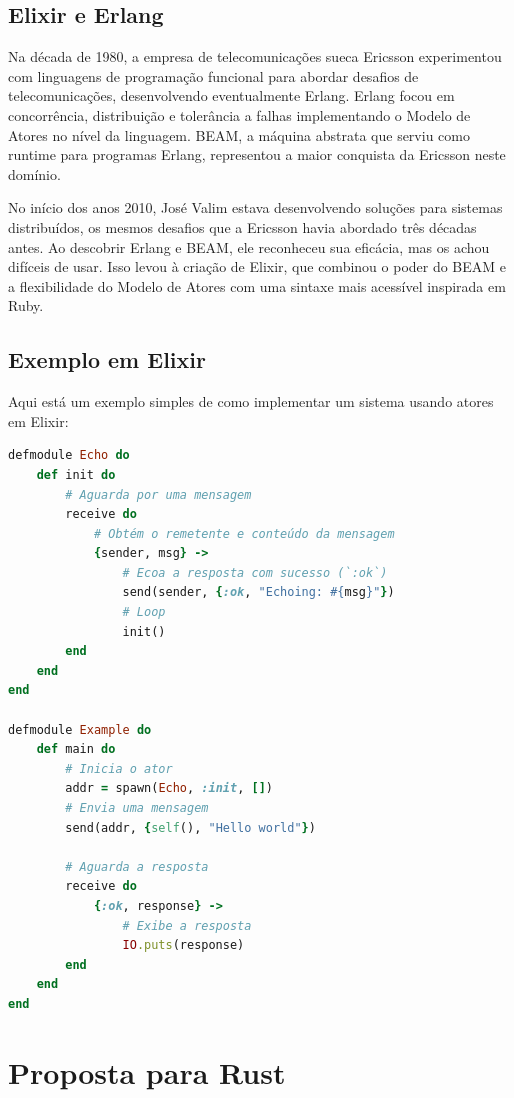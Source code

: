 \subsection{Elixir e Erlang}

Na década de 1980, a empresa de telecomunicações sueca Ericsson experimentou com linguagens de programação funcional para abordar desafios de telecomunicações, desenvolvendo eventualmente Erlang. Erlang focou em concorrência, distribuição e tolerância a falhas implementando o Modelo de Atores no nível da linguagem. BEAM, a máquina abstrata que serviu como runtime para programas Erlang, representou a maior conquista da Ericsson neste domínio.

No início dos anos 2010, José Valim estava desenvolvendo soluções para sistemas distribuídos, os mesmos desafios que a Ericsson havia abordado três décadas antes. Ao descobrir Erlang e BEAM, ele reconheceu sua eficácia, mas os achou difíceis de usar. Isso levou à criação de Elixir, que combinou o poder do BEAM e a flexibilidade do Modelo de Atores com uma sintaxe mais acessível inspirada em Ruby.

\subsection{Exemplo em Elixir}

Aqui está um exemplo simples de como implementar um sistema usando atores em Elixir:

\begin{lstlisting}[language=ruby, caption=Exemplo de Ator Echo em Elixir]
defmodule Echo do
    def init do
        # Aguarda por uma mensagem
        receive do
            # Obtém o remetente e conteúdo da mensagem
            {sender, msg} -> 
                # Ecoa a resposta com sucesso (`:ok`)
                send(sender, {:ok, "Echoing: #{msg}"})
                # Loop
                init()
        end
    end
end

defmodule Example do
    def main do
        # Inicia o ator
        addr = spawn(Echo, :init, []) 
        # Envia uma mensagem
        send(addr, {self(), "Hello world"}) 
        
        # Aguarda a resposta
        receive do 
            {:ok, response} -> 
                # Exibe a resposta
                IO.puts(response) 
        end
    end
end
\end{lstlisting}

\section{Proposta para Rust}

